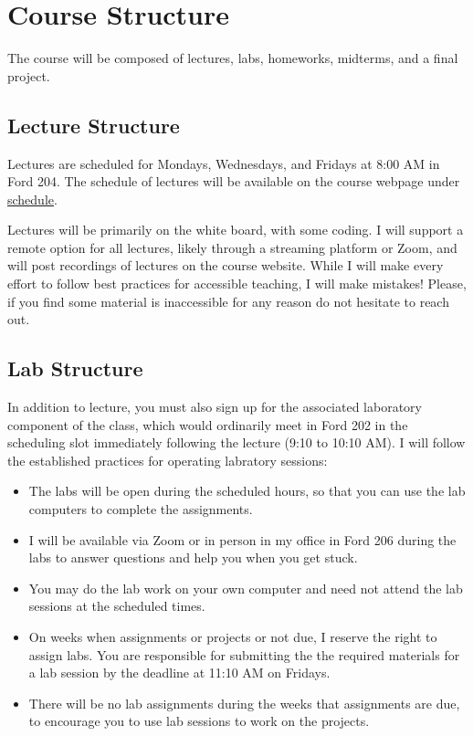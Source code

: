 \documentclass[11pt]{article}
\begin{document}

\section*{Course Structure}

The course will be composed of lectures, labs, homeworks, midterms, and a final project.

\subsection*{Lecture Structure}

Lectures are scheduled for Mondays, Wednesdays, and Fridays at 8:00 AM in Ford 204. The schedule
of lectures will be available on the course webpage under \href{https://cd-public.github.io/courses/data_structures/s-241f21.html}{schedule}.

\bigskip
\noindent Lectures will be primarily on the white board, with some coding. I will support a remote option
for all lectures, likely through a streaming platform or Zoom, and will post recordings of lectures
on the course website. While I will make every effort to follow best practices for accessible teaching, I will make mistakes! Please, if you find some material is inaccessible for any reason
do not hesitate to reach out.

\subsection*{Lab Structure}

In addition to lecture, you must also sign up for the associated laboratory component of the
class, which would ordinarily meet in Ford 202 in the scheduling slot immediately
following the lecture (9:10 to 10:10 AM). I will follow the established practices
for operating labratory sessions:
\begin{itemize}
\item The labs will be open during the scheduled hours, so that you can use the lab computers
to complete the assignments.
\item I will be available via Zoom or in person in my office in Ford 206 during the labs to answer
questions and help you when you get stuck.
\item You may do the lab work on your own computer and need not attend the lab sessions at
the scheduled times.
\item On weeks when assignments or projects or not due, I reserve the right to assign labs. You are responsible for submitting the the required materials for a lab session by the deadline at
11:10 AM on Fridays.
\item There will be no lab assignments during the weeks that assignments are due, to encourage
you to use lab sessions to work on the projects.
\end{itemize}
\end{document}
